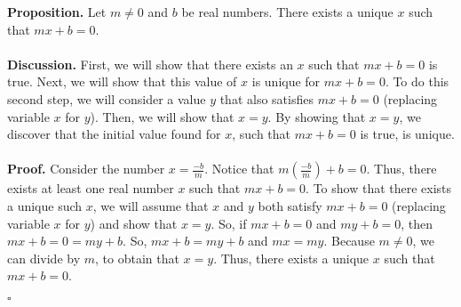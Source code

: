 \documentclass[12pt]{exam}
\begin{document}
\begin{questions}


\question
\textbf{Proposition.} Let $m \neq 0$ and $b$ be real numbers. There exists a unique $x$ such that $mx+b=0$.
\\
\\\textbf{Discussion.} First, we will show that there exists an $x$ such that $mx+b=0$ is true. Next, we will show that this value of $x$ is unique for $mx+b=0$. To do this second step, we will consider a value $y$ that also satisfies $mx+b=0$ (replacing variable $x$ for $y$). Then, we will show that $x=y$. By showing that $x=y$, we discover that the initial value found for $x$, such that $mx+b=0$ is true, is unique.
\\
\\\textbf{Proof.} Consider the number $ x = \frac{-b}{m}$. Notice that $m(\frac{-b}{m}) +b = 0$. Thus, there exists at least one real number $x$ such that $mx+b=0$. To show that there exists a unique such $x$, we will assume that $x$ and $y$ both satisfy $mx+b=0$ (replacing variable $x$ for $y$) and show that $x=y$. So, if $mx+b=0$ and $my+b=0$, then $mx+b=0=my+b$. So, $mx+b=my+b$ and $mx=my$. Because $m \neq 0$, we can divide by $m$, to obtain that $x=y$. Thus, there exists a unique $x$ such that $mx+b=0$.
\begin{flushright}
$\square$
\end{flushright}


\end{questions}
\end{document}
